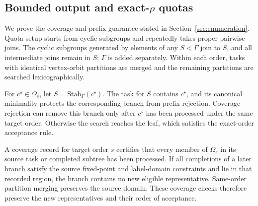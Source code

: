 \documentclass[a5paper, 10pt]{article}
\begin{document}
\endgroup

\subsection{Bounded output and exact-$\rho$ quotas}
\label{app:quota_proof}

We prove the coverage and prefix guarantee stated in Section~\ref{sec:enumeration}. Quota setup starts from cyclic subgroups and repeatedly takes proper pairwise joins. The cyclic subgroups generated by elements of any $S<\Gamma$ join to $S$, and all intermediate joins remain in $S$; $\Gamma$ is added separately. Within each order, tasks with identical vertex-orbit partitions are merged and the remaining partitions are searched lexicographically.

For $c^\star\in\Omega_s$, let $S=\mathrm{Stab}_{\Gamma}(c^\star)$. The task for $S$ contains $c^\star$, and its canonical minimality protects the corresponding branch from prefix rejection. Coverage rejection can remove this branch only after $c^\star$ has been processed under the same target order. Otherwise the search reaches the leaf, which satisfies the exact-order acceptance rule.

A coverage record for target order $s$ certifies that every member of $\Omega_s$ in its source task or completed subtree has been processed. If all completions of a later branch satisfy the source fixed-point and label-domain constraints and lie in that recorded region, the branch contains no new eligible representative. Same-order partition merging preserves the source domain. These coverage checks therefore preserve the new representatives and their order of acceptance.
\end{document}

